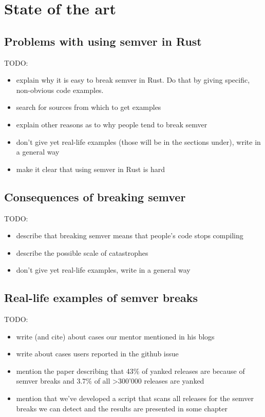 \documentclass[licencjacka,en]{pracamgr}
\begin{document}

\chapter{State of the art}\label{r:chapter_stateoftheart}

\section{Problems with using semver in Rust}\label{r:section_usageofsemver}

TODO:
\begin{itemize}
	\item explain why it is easy to break semver in Rust.
		Do that by giving specific, non-obvious code examples.
	\item search for sources from which to get examples
	\item explain other reasons as to why people tend to break semver
	\item don't give yet real-life examples (those will be in the sections under),
		write in a general way
	\item make it clear that using semver in Rust is hard
\end{itemize}

\section{Consequences of breaking semver}

TODO:
\begin{itemize}
	\item describe that breaking semver means that people's code stops compiling
	\item describe the possible scale of catastrophes
	\item don't give yet real-life examples, write in a general way
\end{itemize}

\section{Real-life examples of semver breaks}

TODO:
\begin{itemize}
	\item write (and cite) about cases our mentor mentioned in his blogs
	\item write about cases users reported in the github issue
	\item mention the paper describing that 43\% of yanked releases
		are because of semver breaks and 3.7\% of all >300'000 releases are yanked
	\item mention that we've developed
		a script that scans all releases for the semver breaks
		we can detect and the results are presented in some chapter
\end{itemize}
\end{document}
